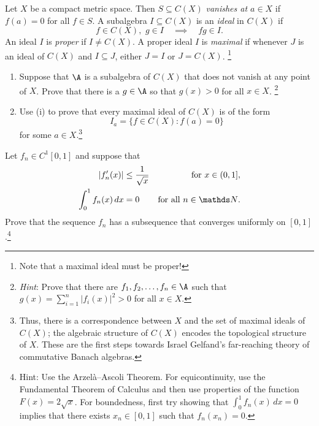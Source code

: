 \documentclass{../homework}
\begin{document}
\begin{Exercise}
	Let $X$ be a compact metric space.  Then $S \subseteq C(X)$
  \emph{vanishes at $a \in X$} if $f(a) = 0$ for all $f \in S$.  A
  subalgebra $I \subseteq C(X)$ is an \emph{ideal} in $C(X)$ if
	\begin{equation*}
		f\in C(X), \,\,g\in I \quad \implies \quad fg \in I.
	\end{equation*}
	An ideal $I$ is \emph{proper} if $I \neq C(X)$.  A proper ideal $I$
  is \emph{maximal} if whenever $J$ is an ideal of $C(X)$ and
  $I \subseteq J$, either $J = I$ or $J = C(X)$.  \footnote{Note that
    a maximal ideal must be proper!}
  \begin{enumerate}
  \item Suppose that $\A$ is a subalgebra of $C(X)$ that does not
    vanish at any point of $X$.  Prove that there is a $g \in \A$ so
    that $g(x) > 0$ for all $x \in X$.  \footnote{\emph{Hint}: Prove
      that there are $f_1,f_2,\ldots, f_n \in \A$ such that
      $g(x) = \sum_{i=1}^n |f_i(x)|^2 > 0$ for all $x \in X$.}

    \begin{solution}

    \end{solution}

  \item Use (i) to prove that every maximal ideal of $C(X)$ is of the
    form
    \begin{equation*}
      I_a = \{ f \in C(X) : f(a) = 0 \}
    \end{equation*}
    for some $a \in X$.\footnote{Thus, there is a correspondence
      between $X$ and the set of maximal ideals of $C(X)$; the
      algebraic structure of $C(X)$ encodes the topological structure
      of $X$.  These are the first steps towards Israel Gelfand's
      far-reaching theory of commutative Banach algebras.}

    \begin{solution}

    \end{solution}
  \end{enumerate}
\end{Exercise}

\begin{Exercise}
	Let $f_n \in C^1[0,1]$ and suppose that
	\begin{align*}
		|f_n'(x)| &\leq \frac{1}{\sqrt{x}}  &\text{for $x \in (0,1]$},\\
		\int_0^1 f_n(x)\,dx &=0 & \text{for all $n \in \N$.}
	\end{align*}
	Prove that the sequence $f_n$ has a subsequence that converges
  uniformly on $[0,1]$.\footnote{Hint: Use the Arzel\`a--Ascoli
    Theorem.  For equicontinuity, use the Fundamental Theorem of
    Calculus and then use properties of the function
    $F(x) = 2\sqrt{x}$.  For boundedness, first try showing that
    $\int_0^1 f_n(x)\,dx = 0$ implies that there exists
    $x_n \in [0,1]$ such that $f_n(x_n) = 0$. }

  \begin{solution}

  \end{solution}
\end{Exercise}
\end{document}
